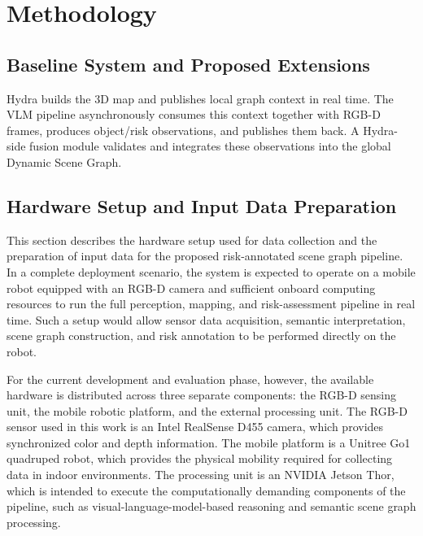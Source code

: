 \chapter{Methodology}

\section{Baseline System and Proposed Extensions}


{\small

Hydra builds the 3D map and publishes local graph context in real time. The VLM pipeline asynchronously consumes this context together with RGB-D frames, produces object/risk observations, and publishes them back. A Hydra-side fusion module validates and integrates these observations into the global Dynamic Scene Graph.
}

\section{Hardware Setup and Input Data Preparation}

This section describes the hardware setup used for data collection and the preparation of input data for the proposed risk-annotated scene graph pipeline. In a complete deployment scenario, the system is expected to operate on a mobile robot equipped with an RGB-D camera and sufficient onboard computing resources to run the full perception, mapping, and risk-assessment pipeline in real time. Such a setup would allow sensor data acquisition, semantic interpretation, scene graph construction, and risk annotation to be performed directly on the robot.

For the current development and evaluation phase, however, the available hardware is distributed across three separate components: the RGB-D sensing unit, the mobile robotic platform, and the external processing unit. The RGB-D sensor used in this work is an Intel RealSense D455 camera, which provides synchronized color and depth information. The mobile platform is a Unitree Go1 quadruped robot, which provides the physical mobility required for collecting data in indoor environments. The processing unit is an NVIDIA Jetson Thor, which is intended to execute the computationally demanding components of the pipeline, such as visual-language-model-based reasoning and semantic scene graph processing.

